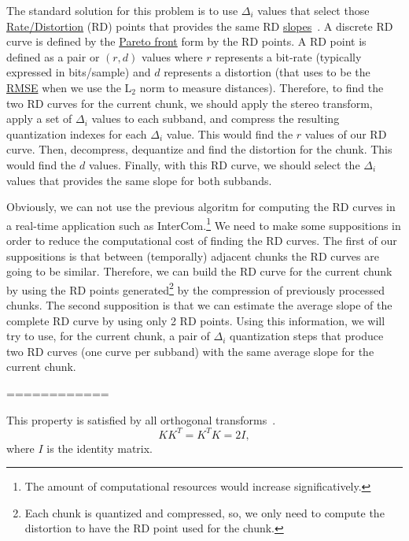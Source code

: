 The standard solution for this problem is to use $\Delta_i$ values
that select those
\href{https://en.wikipedia.org/wiki/Rate%E2%80%93distortion_theory}{Rate/Distortion}
  (RD) points that provides the same RD
  \href{https://en.wikipedia.org/wiki/Slope}{slopes}~\cite{vetterli2014foundations,sayood2017introduction}. A
  discrete RD curve is defined by the
  \href{https://en.wikipedia.org/wiki/Multi-objective_optimization}{Pareto
    front} form by the RD points. A RD point is defined as a pair or
  $(r,d)$ values where $r$ represents a bit-rate (typically expressed
  in bits/sample) and $d$ represents a distortion (that uses to be the
  \href{https://en.wikipedia.org/wiki/Root-mean-square_deviation}{RMSE}
  when we use the L$_2$ norm to measure distances). Therefore, to find
  the two RD curves for the current chunk, we should apply the stereo
  transform, apply a set of $\Delta_i$ values to each subband, and
  compress the resulting quantization indexes for each $\Delta_i$
  value. This would find the $r$ values of our RD curve. Then,
  decompress, dequantize and find the distortion for the chunk. This
  would find the $d$ values. Finally, with this RD curve, we should
  select the $\Delta_i$ values that provides the same slope for both
  subbands.

Obviously, we can not use the previous algoritm for computing the RD
curves in a real-time application such as InterCom.\footnote{The
amount of computational resources would increase significatively.} We
need to make some suppositions in order to reduce the computational
cost of finding the RD curves. The first of our suppositions is that
between (temporally) adjacent chunks the RD curves are going to be
similar. Therefore, we can build the RD curve for the current chunk by
using the RD points generated\footnote{Each chunk is quantized and
compressed, so, we only need to compute the distortion to have the RD
point used for the chunk.} by the compression of previously processed
chunks. The second supposition is that we can estimate the average
slope of the complete RD curve by using only 2 RD points. Using this
information, we will try to use, for the current chunk, a pair of
$\Delta_i$ quantization steps that produce two RD curves (one curve
per subband) with the same average slope for the current chunk.

============

 This
property is satisfied by all orthogonal
transforms~\cite{sayood2017introduction}.
\begin{equation}
  KK^T=K^TK=2I,
  \label{eq:ortho_matrix_test}
\end{equation}
where $I$ is the identity matrix.

